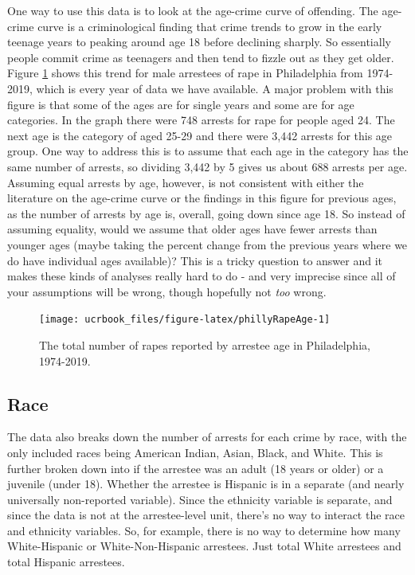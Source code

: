 \documentclass[
  12pt,
  openany]{book}
\begin{document}
One way to use this data is to look at the age-crime curve of offending. The age-crime curve is a criminological finding that crime trends to grow in the early teenage years to peaking around age 18 before declining sharply. So essentially people commit crime as teenagers and then tend to fizzle out as they get older. Figure \ref{fig:phillyRapeAge} shows this trend for male arrestees of rape in Philadelphia from 1974-2019, which is every year of data we have available. A major problem with this figure is that some of the ages are for single years and some are for age categories. In the graph there were 748 arrests for rape for people aged 24. The next age is the category of aged 25-29 and there were 3,442 arrests for this age group. One way to address this is to assume that each age in the category has the same number of arrests, so dividing 3,442 by 5 gives us about 688 arrests per age. Assuming equal arrests by age, however, is not consistent with either the literature on the age-crime curve or the findings in this figure for previous ages, as the number of arrests by age is, overall, going down since age 18. So instead of assuming equality, would we assume that older ages have fewer arrests than younger ages (maybe taking the percent change from the previous years where we do have individual ages available)? This is a tricky question to answer and it makes these kinds of analyses really hard to do - and very imprecise since all of your assumptions will be wrong, though hopefully not \emph{too} wrong.

\begin{figure}

{\centering \texttt{[image: ucrbook\_files/figure-latex/phillyRapeAge-1]} 

}

\caption{The total number of rapes reported by arrestee age in Philadelphia, 1974-2019.}\label{fig:phillyRapeAge}
\end{figure}

\hypertarget{race}{%
\subsection{Race}\label{race}}

The data also breaks down the number of arrests for each crime by race, with the only included races being American Indian, Asian, Black, and White. This is further broken down into if the arrestee was an adult (18 years or older) or a juvenile (under 18). Whether the arrestee is Hispanic is in a separate (and nearly universally non-reported variable). Since the ethnicity variable is separate, and since the data is not at the arrestee-level unit, there's no way to interact the race and ethnicity variables. So, for example, there is no way to determine how many White-Hispanic or White-Non-Hispanic arrestees. Just total White arrestees and total Hispanic arrestees.
\end{document}
